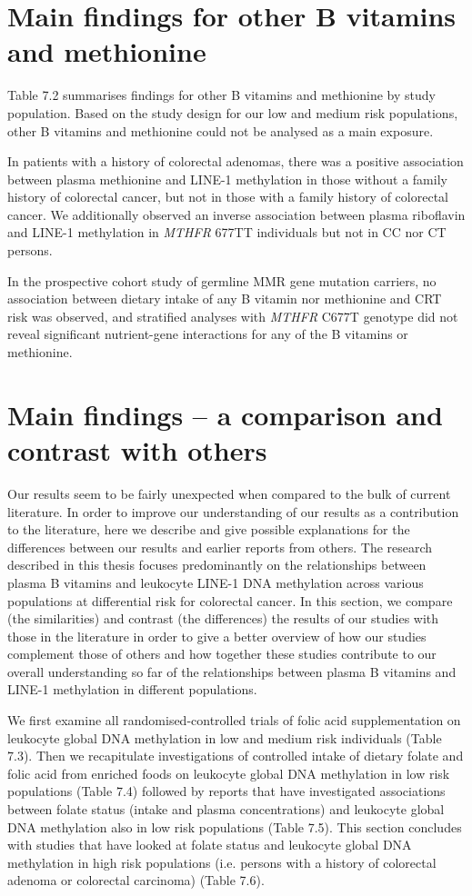 \section[]{Main findings for other B vitamins and methionine} %
\noindent Table 7.2 summarises findings for other B vitamins and methionine by study population. Based on the study design for our low and medium risk populations, other B vitamins and methionine could not be analysed as a main exposure.

\noindent In patients with a history of colorectal adenomas, there was a positive association between plasma methionine and LINE-1 methylation in those without a family history of colorectal cancer, but not in those with a family history of colorectal cancer. We additionally observed an inverse association between plasma riboflavin and LINE-1 methylation in \emph{MTHFR} 677TT individuals but not in CC nor CT persons.

\noindent In the prospective cohort study of germline MMR gene mutation carriers, no association between dietary intake of any B vitamin nor methionine and CRT risk was observed, and stratified analyses with \emph{MTHFR} C677T genotype did not reveal significant nutrient-gene interactions for any of the B vitamins or methionine.

\section[]{Main findings -- a comparison and contrast with others} %
\noindent Our results seem to be fairly unexpected when compared to the bulk of current literature. In order to improve our understanding of our results as a contribution to the literature, here we describe and give possible explanations for the differences between our results and earlier reports from others. The research described in this thesis focuses predominantly on the relationships between plasma B vitamins and leukocyte LINE-1 DNA methylation across various populations at differential risk for colorectal cancer. In this section, we compare (the similarities) and contrast (the differences) the results of our studies with those in the literature in order to give a better overview of how our studies complement those of others and how together these studies contribute to our overall understanding so far of the relationships between plasma B vitamins and LINE-1 methylation in different populations.

\noindent We first examine all randomised-controlled trials of folic acid supplementation on leukocyte global DNA methylation in low and medium risk individuals (Table 7.3). Then we recapitulate investigations of controlled intake of dietary folate and folic acid from enriched foods on leukocyte global DNA methylation in low risk populations (Table 7.4) followed by reports that have investigated associations between folate status (intake and plasma concentrations) and leukocyte global DNA methylation also in low risk populations (Table 7.5). This section concludes with studies that have looked at folate status and leukocyte global DNA methylation in high risk populations (i.e. persons with a history of colorectal adenoma or colorectal carcinoma) (Table 7.6).


